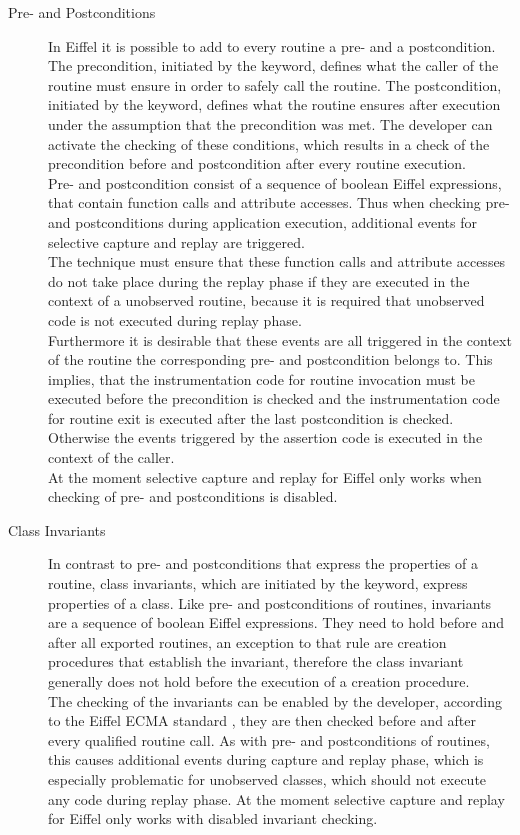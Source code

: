 \begin{description}
 \item [Pre- and Postconditions] In Eiffel it is possible to add to every routine a pre- and a postcondition. The precondition, initiated by the  keyword, defines what the caller of the routine must ensure in order to safely call the routine. The postcondition, initiated by the  keyword, defines what the routine ensures after execution under the assumption that the precondition was met. The developer can activate the checking of these conditions, which results in a check of the precondition before and postcondition after every routine execution.\\
 Pre- and postcondition consist of a sequence of boolean Eiffel expressions, that contain function calls and attribute accesses. Thus when checking pre- and postconditions during application execution, additional events for selective capture and replay are triggered.\\
The technique must ensure that these function calls and attribute accesses do not take place during the replay phase if they are executed in the context of a unobserved routine, because it is required that unobserved code is not executed during replay phase. \\
Furthermore it is desirable that these events are all triggered in the context of the routine the corresponding pre- and postcondition belongs to. This implies, that the instrumentation code for routine invocation must be executed before the precondition is checked and the instrumentation code for routine exit is executed after the last postcondition is checked. Otherwise the events triggered by the assertion code is executed in the context of the caller.\\
At the moment selective capture and replay for Eiffel only works when checking of pre- and postconditions is disabled.

 \item [Class Invariants] In contrast to pre- and postconditions that express the properties of a routine, class invariants, which are initiated by the  keyword, express properties of a class. Like pre- and postconditions of routines, invariants are a sequence of boolean Eiffel expressions. They need to hold before and after all exported routines, an exception to that rule are creation procedures that establish the invariant, therefore the class invariant generally does not hold before the execution of a creation procedure.\\
The checking of the invariants can be enabled by the developer, according to the Eiffel ECMA standard \cite{Eiffel-ECMA}, they are then checked before and after every qualified routine call. As with pre- and postconditions of routines, this causes additional events during capture and replay phase, which is especially problematic for unobserved classes, which should not execute any code during replay phase. At the moment selective capture and replay for Eiffel only works with disabled invariant checking.


\end{description}
